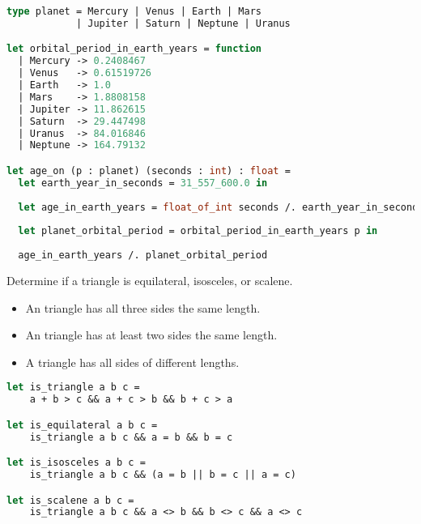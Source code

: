 \begin{lstlisting}[language=OCaml]
type planet = Mercury | Venus | Earth | Mars
            | Jupiter | Saturn | Neptune | Uranus

let orbital_period_in_earth_years = function
  | Mercury -> 0.2408467
  | Venus   -> 0.61519726
  | Earth   -> 1.0
  | Mars    -> 1.8808158
  | Jupiter -> 11.862615
  | Saturn  -> 29.447498
  | Uranus  -> 84.016846
  | Neptune -> 164.79132

let age_on (p : planet) (seconds : int) : float =
  let earth_year_in_seconds = 31_557_600.0 in
  
  let age_in_earth_years = float_of_int seconds /. earth_year_in_seconds in
  
  let planet_orbital_period = orbital_period_in_earth_years p in
  
  age_in_earth_years /. planet_orbital_period

\end{lstlisting}

Determine if a triangle is equilateral, isosceles, or scalene.

\begin{itemize}
  \item An  triangle has all three sides the same length.
  \item An  triangle has at least two sides the same length.
  \item A  triangle has all sides of different lengths.
\end{itemize}

\begin{lstlisting}[language=OCaml]
let is_triangle a b c =
	a + b > c && a + c > b && b + c > a

let is_equilateral a b c =
	is_triangle a b c && a = b && b = c

let is_isosceles a b c =
	is_triangle a b c && (a = b || b = c || a = c)

let is_scalene a b c =
	is_triangle a b c && a <> b && b <> c && a <> c
\end{lstlisting}


